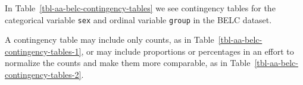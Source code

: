 \documentclass[
  letterpaper,
]{latex/krantz}
\theoremstyle{definition}
\theoremstyle{remark}
\begin{document}
In Table~\ref{tbl-aa-belc-contingency-tables} we see contingency tables
for the categorical variable \texttt{sex} and ordinal variable
\texttt{group} in the BELC dataset.

\begin{table}

\caption{\label{tbl-aa-belc-contingency-tables}Contingency tables for
categorical variable \texttt{sex} and ordinal variable \texttt{group} in
the BELC dataset.}

\begin{minipage}{0.50\linewidth}



\end{minipage}%
%
\begin{minipage}{0.50\linewidth}



\end{minipage}%

\end{table}%

A contingency table may include only counts, as in
Table~\ref{tbl-aa-belc-contingency-tables-1}, or may include proportions
or percentages in an effort to normalize the counts and make them more
comparable, as in Table~\ref{tbl-aa-belc-contingency-tables-2}.
\end{document}
